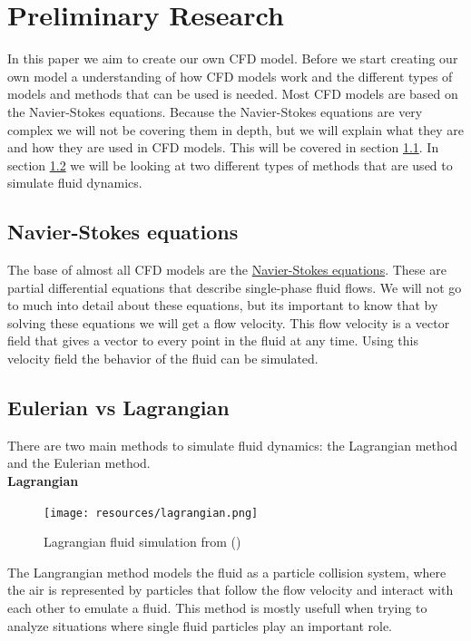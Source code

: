 \documentclass[a4paper,12pt]{article}
\begin{document}
\section{Preliminary Research}
In this paper we aim to create our own CFD model. 
Before we start creating our own model a understanding of how CFD models work 
and the different types of models and methods that can be used is needed.
Most CFD models are based on the Navier-Stokes equations. Because the Navier-Stokes equations are very complex we will not be covering them in depth, 
but we will explain what they are and how they are used in CFD models.
This will be covered in section \ref{navierstokes}.
In section \ref{eulerianlagrangian} we will be looking at two different types of methods that are used to simulate fluid dynamics.

\subsection{Navier-Stokes equations} \label{navierstokes}
The base of almost all CFD models are the \href{https://en.wikipedia.org/wiki/Navier%E2%80%93Stokes_equations}{Navier-Stokes equations}.
These are partial differential equations that describe single-phase fluid flows. 
We will not go to much into detail about these equations, but its important to know that by solving these equations we will get a flow velocity.
This flow velocity is a vector field that gives a vector to every point in the fluid at any time. 
Using this velocity field the behavior of the fluid can be simulated.

\subsection{Eulerian vs Lagrangian} \label{eulerianlagrangian}
There are two main methods to simulate fluid dynamics: the Lagrangian method and the Eulerian method. \\

\textbf{Lagrangian} \\

\begin{figure}[H]
	\centering
	\texttt{[image: resources/lagrangian.png]}
	\caption{Lagrangian fluid simulation from (\cite{seblague})}
\end{figure}

The Langrangian method models the fluid as a particle collision system, where the air is represented by
particles that follow the flow velocity and interact with each other to emulate a fluid. 
This method is mostly usefull when trying to analyze situations where single fluid particles play an important role.\\
\end{document}

